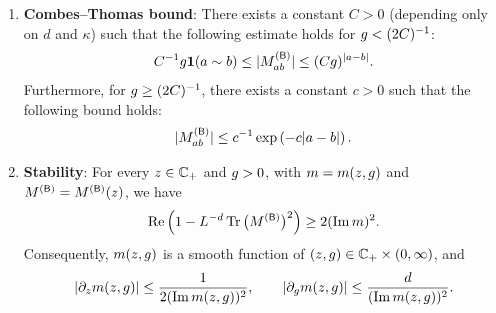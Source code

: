 \begin{lemma}
\begin{enumerate}
\item[(3)] {\bf Combes--Thomas bound}: There exists a constant $C>0$ (depending only on $d$ and $\kappa$) such that the following estimate holds for $g<(2C)^{-1}$: 
\begin{align}
\label{Mbound_AO}
C^{-1}g \mathbf 1(a\sim b)\le |M^{({\mathsf{B}})}_{ab}|\le (Cg)^{|a-b|}. 
\end{align}
Furthermore, for $g\ge (2C)^{-1}$, there exists a constant $c>0$ such that the following  bound holds:
\begin{align}\label{Mbound_AO2}
|M^{({\mathsf{B}})}_{ab}|\le c^{-1}\exp\left({-c|a-b|}\right).
\end{align}

\item[(4)] {\bf Stability}: For every $z\in\mathbb C_+$ and $g>0$, with $m=m(z,g)$ and $M^{({\mathsf{B}})}=M^{({\mathsf{B}})}(z)$, we have
\[ \operatorname{{\mathrm{Re}}}\Big(1-L^{-d}\operatorname{Tr}\big(M^{({\mathsf{B}})}\big)^2\Big)\ge 2(\operatorname{{\mathrm{Im}}} m)^2 . \]
Consequently, $m(z,g)$ is a smooth function of $(z,g)\in\mathbb C_+\times(0,\infty)$, and
\[ |\partial_z m(z,g)|\le \frac{1}{2(\operatorname{{\mathrm{Im}}} m(z,g))^2},\qquad |\partial_{g} m(z,g)|\le \frac{d}{(\operatorname{{\mathrm{Im}}} m(z,g))^2}. \]
\end{enumerate}
\end{lemma}
